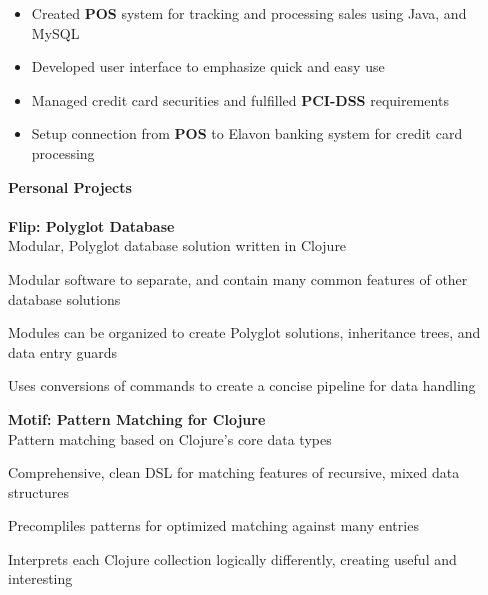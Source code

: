 \documentclass[12pt]{article}
\begin{document}
\begin{itemize}
	\item[$\circ$] \small{Created \textbf{POS} system for tracking and processing sales using Java, and MySQL}
	\item[$\circ$] \small{Developed user interface to emphasize quick and easy use}
	\item[$\circ$] \small{Managed credit card securities and fulfilled \textbf{PCI-DSS} requirements}
	\item[$\circ$] \small{Setup connection from \textbf{POS} to Elavon banking system for credit card processing}
\end{itemize}
\vspace{2mm}
\large{\textbf{Personal Projects}}\\\\
\small{\textbf{Flip: Polyglot Database}}\\
\hspace*{6mm}\footnotesize{Modular, Polyglot database solution written in Clojure}
\begin{itemize}
	\small{\item[$\circ$] Modular software to separate, and contain many common features of other database solutions}
	\small{\item[$\circ$] Modules can be organized to create Polyglot solutions, inheritance trees, and data entry guards}
	\small{\item[$\circ$] Uses conversions of commands to create a concise pipeline for data handling}
\end{itemize}
\vspace{1mm}
\small{\textbf{Motif: Pattern Matching for Clojure}}\\
\hspace*{6mm}\footnotesize{Pattern matching based on Clojure's core data types}
\begin{itemize}
	\small{\item[$\circ$] Comprehensive, clean DSL for matching features of recursive, mixed data structures}
	\small{\item[$\circ$] Precompliles patterns for optimized matching against many entries }
	\small{\item[$\circ$] Interprets each Clojure collection logically differently, creating useful and interesting }
\end{itemize}
\end{document}
